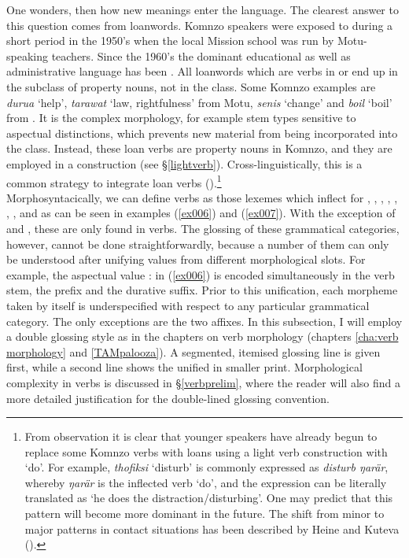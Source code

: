 One wonders, then how new  meanings enter the language. The clearest answer to this question comes from loanwords. Komnzo speakers were exposed to  during a short period in the 1950's when the local Mission school was run by Motu-speaking teachers. Since the 1960's the dominant educational as well as administrative language has been . All loanwords which are verbs in  or  end up in the  subclass of property nouns, not in the  class. Some Komnzo examples are \emph{durua} `help', \emph{tarawat} `law, rightfulness' from Motu, \emph{senis} `change' and \emph{boil} `boil' from . It is the complex  morphology, for example stem types sensitive to aspectual distinctions, which prevents new material from being incorporated into the  class. Instead, these loan verbs are property nouns in Komnzo, and they are employed in a  construction (see \S{}\ref{lightverb}). Cross-linguistically, this is a common strategy to integrate loan verbs (\citealt{Wichmann:2008loanverbs}).\footnote{From observation it is clear that younger speakers have already begun to replace some Komnzo verbs with  loans using a light verb construction with `do'. For example, \emph{thofiksi} `disturb' is commonly expressed as \emph{disturb ŋarär}, whereby \emph{ŋarär} is the inflected verb `do', and the expression can be literally translated as `he does the distraction/disturbing'. One may predict that this pattern will become more dominant in the future. The shift from minor to major patterns in contact situations has been described by Heine and Kuteva (\citeyear[44]{Heine:2005wp}).}\\

Morphosyntacically, we can define verbs as those lexemes which inflect for , , , , , , , and  as can be seen in examples (\ref{ex006}) and (\ref{ex007}). With the exception of  and , these are only found in verbs. The glossing of these grammatical categories, however, cannot be done straightforwardly, because a number of them can only be understood after unifying values from different morphological slots. For example, the aspectual value \Pst:\Dur{} in (\ref{ex006}) is encoded simultaneously in the verb stem, the prefix and the durative suffix. Prior to this unification, each morpheme taken by itself is underspecified with respect to any particular grammatical category. The only exceptions are the two  affixes. In this subsection, I will employ a double glossing style as in the chapters on verb morphology (chapters \ref{cha:verb morphology} and \ref{TAMpalooza}). A segmented, itemised glossing line is given first, while a second line shows the unified  in smaller print. Morphological complexity in verbs is discussed in \S{}\ref{verbprelim}, where the reader will also find a more detailed justification for the double-lined glossing convention.

